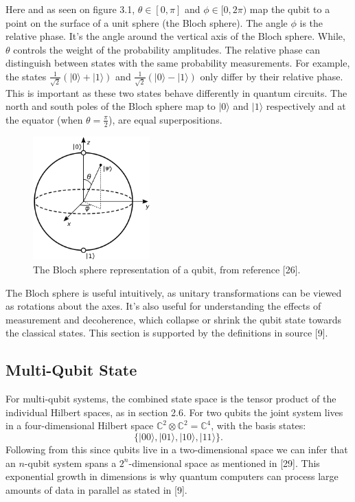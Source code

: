 \noindent Here and as seen on figure 3.1, \( \theta \in [0, \pi] \) and \( \phi \in [0, 2\pi) \) map the qubit to a point on the surface of a unit sphere (the Bloch sphere). The angle \( \phi \) is the relative phase. It's the angle around the vertical axis of the Bloch sphere. While, \( \theta \) controls the weight of the probability amplitudes. The relative phase can distinguish between states with the same probability measurements. For example, the states \( \frac{1}{\sqrt{2}}(|0\rangle + |1\rangle) \) and \( \frac{1}{\sqrt{2}}(|0\rangle - |1\rangle) \) only differ by their relative phase. This is important as these two states behave differently in quantum circuits. The north and south poles of the Bloch sphere map to \( |0\rangle \) and \( |1\rangle \) respectively and at the equator (when \(\theta=\frac{\pi }{2}\)), are equal superpositions.



\begin{figure}[H]
    \centering
    \includegraphics[width=0.4\textwidth]{Bloch_sphere.png}
    \caption{The Bloch sphere representation of a qubit, from reference [26].}
    \label{fig:bloch}
\end{figure}


\noindent The Bloch sphere is useful intuitively, as unitary transformations can be viewed as rotations about the axes. It's also useful for understanding the effects of measurement and decoherence, which collapse or shrink the qubit state towards the classical states. This section is supported by the definitions in source [9].



\subsection{Multi-Qubit State}

For  multi-qubit systems, the combined state space is the tensor product of the individual Hilbert spaces, as in section 2.6. For two qubits the joint system lives in a four-dimensional Hilbert space $\mathbb{C}^2 \otimes \mathbb{C}^2 = \mathbb{C}^4$, with the basis states:
\[
\{ |00\rangle, |01\rangle, |10\rangle, |11\rangle \}.
\]
\noindent Following from this since qubits live in a two-dimensional space we can infer that an $n$-qubit system spans a $2^n$-dimensional space as mentioned in [29]. This exponential growth in dimensions is why quantum computers can process large amounts of data in parallel as stated in [9].

